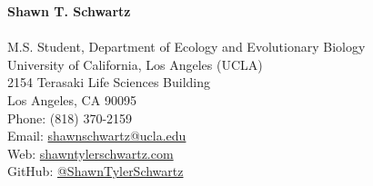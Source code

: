 {\LARGE \bf Shawn T. Schwartz} \\ \\
M.S. Student, Department of Ecology and Evolutionary Biology \\
University of California, Los Angeles (UCLA) \\
2154 Terasaki Life Sciences Building \\
Los Angeles, CA 90095 \\
Phone: (818) 370-2159 \\
Email:  \textcolor{RoyalBlue}{\href{mailto:shawnschwartz@ucla.edu}{shawnschwartz@ucla.edu}} \\
Web: \textcolor{RoyalBlue}{\href{https://shawntylerschwartz.com}{shawntylerschwartz.com}} \\
GitHub: \textcolor{RoyalBlue}{\href{https://github.com/ShawnTylerSchwartz}{@ShawnTylerSchwartz}} \\ \\
\vspace{-1.5cm}